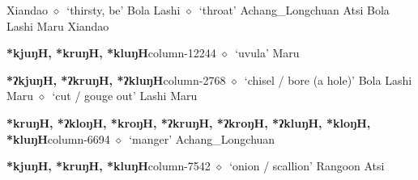          Xiandao 
\hspace{1ex}
         $\diamond$~`thirsty, be'
         Bola 
\hspace{1ex}
         Lashi 
\hspace{1ex}
         $\diamond$~`throat'
         Achang\_Longchuan 
\hspace{1ex}
         Atsi 
\hspace{1ex}
         Bola 
\hspace{1ex}
         Lashi 
\hspace{1ex}
         Maru 
\hspace{1ex}
         Xiandao 
  \item {\footnotesize \textbf{*kjuŋH, *kruŋH, *kluŋH}}{\tiny column-12244}
         $\diamond$~`uvula'
         Maru 
  \item {\footnotesize \textbf{*ʔkjuŋH, *ʔkruŋH, *ʔkluŋH}}{\tiny column-2768}
         $\diamond$~`chisel / bore (a hole)'
         Bola 
\hspace{1ex}
         Lashi 
\hspace{1ex}
         Maru 
\hspace{1ex}
         $\diamond$~`cut / gouge out'
         Lashi 
\hspace{1ex}
         Maru 
  \item {\footnotesize \textbf{*kruŋH, *ʔkloŋH, *kroŋH, *ʔkruŋH, *ʔkroŋH, *ʔkluŋH, *kloŋH, *kluŋH}}{\tiny column-6694}
         $\diamond$~`manger'
         Achang\_Longchuan 
  \item {\footnotesize \textbf{*kjuŋH, *kruŋH, *kluŋH}}{\tiny column-7542}
         $\diamond$~`onion / scallion'
         Rangoon 
\hspace{1ex}
         Atsi 
\hspace{1ex}
